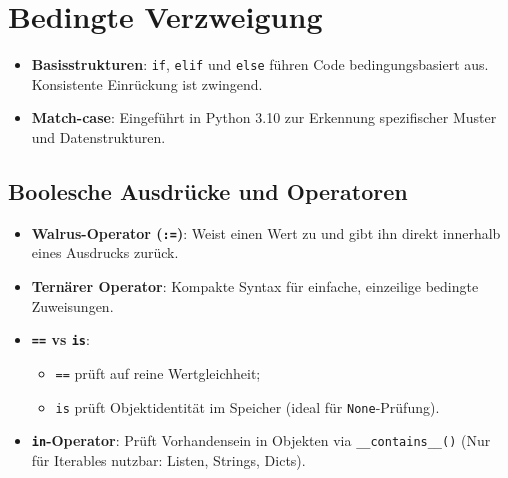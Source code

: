 \section{Bedingte Verzweigung}
\begin{itemize}
    \item \textbf{Basisstrukturen}: \texttt{if}, \texttt{elif} und \texttt{else} führen Code bedingungsbasiert aus. Konsistente Einrückung ist zwingend.
    \item \textbf{Match-case}: Eingeführt in Python 3.10 zur Erkennung spezifischer Muster und Datenstrukturen.
\end{itemize}



\subsection{Boolesche Ausdrücke und Operatoren}
\begin{itemize}
    \item \textbf{Walrus-Operator (\texttt{:=})}: Weist einen Wert zu und gibt ihn direkt innerhalb eines Ausdrucks zurück.
    \item \textbf{Ternärer Operator}: Kompakte Syntax für einfache, einzeilige bedingte Zuweisungen.
    \item \textbf{\texttt{==} vs \texttt{is}}:
    \begin{itemize}
        \item \texttt{==} prüft auf reine Wertgleichheit; 
        \item \texttt{is} prüft Objektidentität im Speicher (ideal für \texttt{None}-Prüfung).
    \end{itemize} 
    \item \textbf{\texttt{in}-Operator}: Prüft Vorhandensein in Objekten via \texttt{\_\_contains\_\_()} (Nur für Iterables nutzbar: Listen, Strings, Dicts).
\end{itemize}



